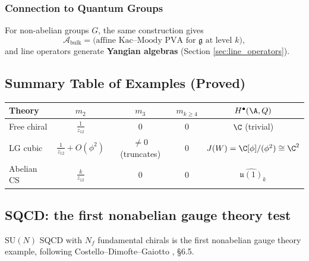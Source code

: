\subsubsection{Connection to Quantum Groups}

For non-abelian groups $G$, the same construction gives
\begin{equation}
\mathcal{A}_{\text{bulk}} = \text{(affine Kac--Moody PVA for $\mathfrak{g}$ at level $k$)},
\end{equation}
and line operators generate \textbf{Yangian algebras} (Section \ref{sec:line_operators}).

\subsection{Summary Table of Examples (Proved)}

\begin{center}
\begin{tabular}{|l|c|c|c|c|}
\hline
\textbf{Theory} & $m_2$ & $m_3$ & $m_{k \geq 4}$ & $H^\bullet(\A, Q)$ \\
\hline
Free chiral & $\frac{1}{z_{12}}$ & $0$ & $0$ & $\C$ (trivial) \\
\hline
LG cubic & $\frac{1}{z_{12}} + O(\phi^2)$ & $\neq 0$ (truncates) & $0$ & $J(W) = \C[\phi]/(\phi^2) \cong \C^2$ \\
\hline
Abelian CS & $\frac{k}{z_{12}}$ & $0$ & $0$ & $\widehat{\mathfrak{u}(1)}_k$ \\
\hline
\end{tabular}
\end{center}

\subsection{SQCD: the first nonabelian gauge theory test}
\label{subsec:sqcd-nonabelian-test}

\providecommand{\QBRST}{Q_{\mathrm{BRST}}}

$\mathrm{SU}(N)$ SQCD with $N_f$ fundamental chirals is the first nonabelian gauge theory example, following Costello--Dimofte--Gaiotto
\cite{CDG2023}, \S6.5.


